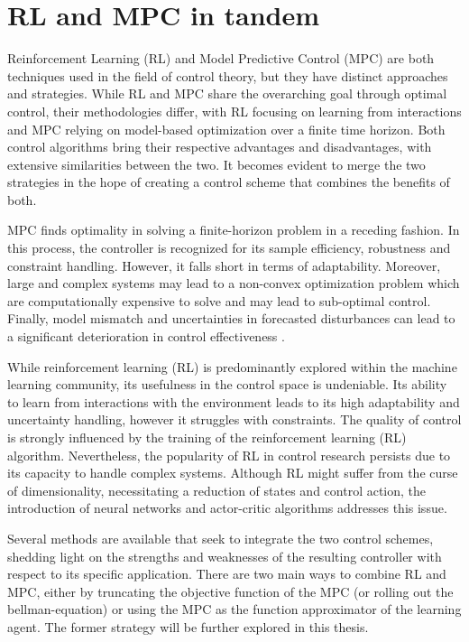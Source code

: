 \section{RL and MPC in tandem}
Reinforcement Learning (RL) and Model Predictive Control (MPC) are both techniques used in the field of control theory, but they have distinct approaches and strategies. While RL and MPC share the overarching goal through optimal control, their methodologies differ, with RL focusing on learning from interactions and MPC relying on model-based optimization over a finite time horizon. 
Both control algorithms bring their respective advantages and disadvantages, with extensive similarities between the two. It becomes evident to merge the two strategies in the hope of creating a control scheme that combines the benefits of both. 

MPC finds optimality in solving a finite-horizon problem in a receding fashion.  In this process, the controller is recognized for its sample efficiency, robustness and constraint handling. However, it falls short in terms of adaptability. Moreover, large and complex systems may lead to a non-convex optimization problem which are computationally expensive to solve and may lead to sub-optimal control. Finally, model mismatch and uncertainties in forecasted disturbances can lead to a significant deterioration in control effectiveness \cite{arroyoReinforcedModelPredictive2022}.

While reinforcement learning (RL) is predominantly explored within the machine learning community, its usefulness in the control space is undeniable. Its ability to learn from interactions with the environment leads to its high adaptability and uncertainty handling, however it struggles with constraints. The quality of control is strongly influenced by the training of the reinforcement learning (RL) algorithm. Nevertheless, the popularity of RL in control research persists due to its capacity to handle complex systems. Although RL might suffer from the curse of dimensionality, necessitating a reduction of states and control action, the introduction of neural networks and actor-critic algorithms addresses this issue.


Several methods are available that seek to integrate the two control schemes, shedding light on the strengths and weaknesses of the resulting controller with respect to its specific application. There are two main ways to combine RL and MPC, either by truncating the objective function of the MPC (or rolling out the bellman-equation) or using the MPC as the function approximator of the learning agent. The former strategy will be further explored in this thesis.

